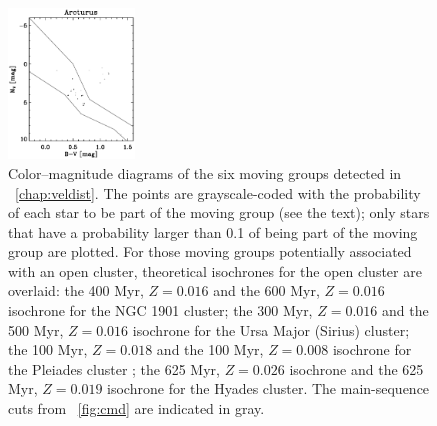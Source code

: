 \begin{figure}
\begin{center}
\includegraphics[width=0.3\textwidth]{figs_groups/cmd_arcturus.ps}
\end{center}
\caption[Color--magnitude diagrams of the six moving groups detected
in \chaptername~\ref{chap:veldist}]{Color--magnitude diagrams of the
six moving groups detected in \chaptername~\ref{chap:veldist}. The
points are grayscale-coded with the probability of each star to be
part of the moving group (see the text); only stars that have a
probability larger than 0.1 of being part of the moving group are
plotted. For those moving groups potentially associated with an open
cluster, theoretical isochrones \citep{Marigo08a,Bertelli94a} for the
open cluster are overlaid: the 400 Myr, $Z=0.016$
\citep{Carraro07a} and the 600 Myr, $Z=0.016$ \citep{Pavani01a}
isochrone for the NGC 1901 cluster; the 300 Myr, $Z=0.016$
\citep{1993AJ....105..226S} and the 500 Myr, $Z=0.016$ \citep{King03a}
isochrone for the Ursa Major (Sirius) cluster; the 100 Myr, $Z= 0.018$
\citep{Boesgaard90a,Gratton00a} and the 100 Myr, $Z=0.008$
\citep{Percival05a} isochrone for the Pleiades cluster ; the 625 Myr,
$Z = 0.026$ isochrone \citep{Perryman98a} and the 625 Myr, $Z=0.019$
isochrone for the Hyades cluster. The main-sequence cuts from
\figurename~\ref{fig:cmd} are indicated in gray.}\label{fig:groupcmd}
\end{figure}

